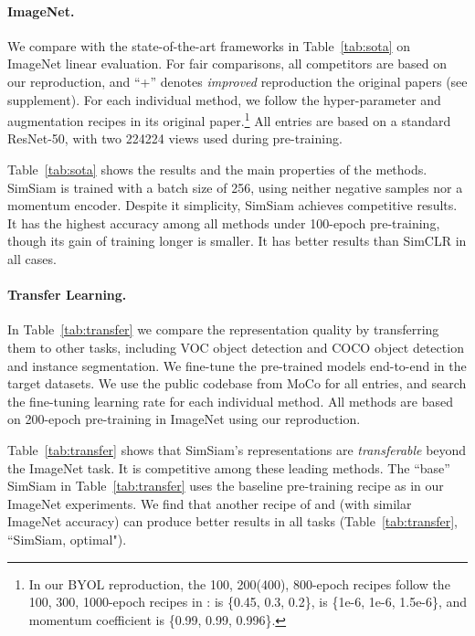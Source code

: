 \documentclass[final]{cvpr}
\newcommand{\appdx}{supplement}
\begin{document}
\paragraph{ImageNet.}
We compare with the state-of-the-art frameworks in Table~\ref{tab:sota} on ImageNet linear evaluation. For fair comparisons, all competitors are based on our reproduction, and ``+'' denotes \emph{improved} reproduction \vs the original papers (see \appdx).
For each individual method, we follow the hyper-parameter and augmentation recipes in its original paper.\footnote{In our BYOL reproduction, the 100, 200(400), 800-epoch recipes follow the 100, 300, 1000-epoch recipes in \cite{Grill2020}:  is \{0.45, 0.3, 0.2\},  is \{1e-6, 1e-6, 1.5e-6\}, and momentum coefficient is \{0.99, 0.99, 0.996\}.}
All entries are based on a standard ResNet-50, with two 224224 views used during pre-training.


Table~\ref{tab:sota} shows the results and the main properties of the methods.
SimSiam is trained with a batch size of 256, using neither negative samples nor a momentum encoder.
Despite it simplicity, SimSiam achieves competitive results.
It has the highest accuracy among all methods under 100-epoch pre-training, though its gain of training longer is smaller. 
It has better results than SimCLR in all cases.

\paragraph{Transfer Learning.} In Table~\ref{tab:transfer} we compare the representation quality by transferring them to other tasks, including VOC \cite{Everingham2010} object detection and COCO \cite{Lin2014} object detection and instance segmentation.
 We fine-tune the pre-trained models end-to-end in the target datasets. We use the public codebase from MoCo \cite{He2019a} for all entries, and search the fine-tuning learning rate for each individual method.
All methods are based on 200-epoch pre-training in ImageNet using our reproduction.

Table~\ref{tab:transfer} shows that SimSiam's representations are \emph{transferable} beyond the ImageNet task.
It is competitive among these leading methods. The ``base'' SimSiam in Table~\ref{tab:transfer} uses the baseline pre-training recipe as in our ImageNet experiments. We find that another recipe of  and  (with similar ImageNet accuracy) can produce better results in all tasks (Table~\ref{tab:transfer}, ``SimSiam, optimal").
\end{document}
